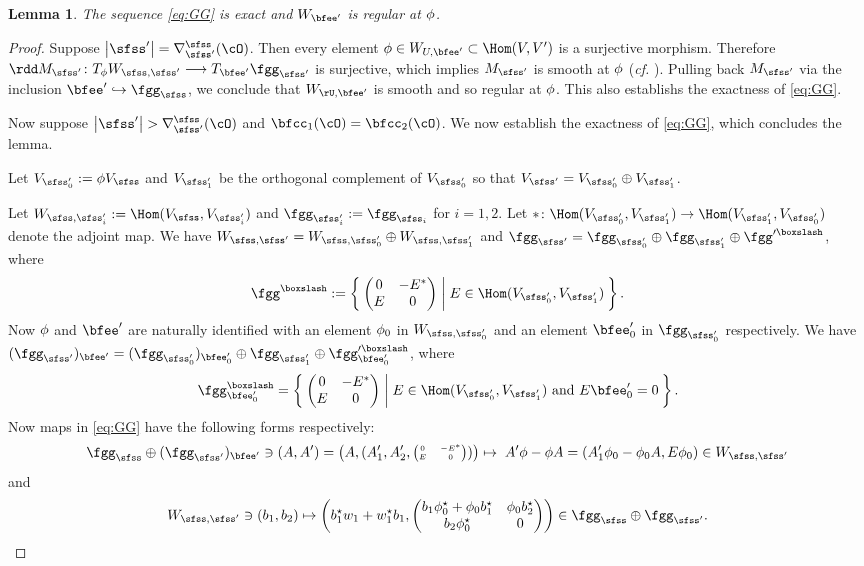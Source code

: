 \documentclass[12pt,a4paper]{amsart}
\def\abs#1{\left|{#1}\right|}
\newcommand{\E}{\mathbf{E}}
\numberwithin{equation}{section}
\newtheorem{lem}[thm]{Lemma}
\theoremstyle{remark}
\def\UU{\rU}
\def\mstar{{\star}}
\def\cf{\emph{cf.} }
\begin{document}
\begin{lem}
The sequence \eqref{eq:GG} is exact and $W_{\Xp}$ is regular at $\phi$.
\end{lem}
\begin{proof}

  Suppose $\abs{\sfss'} = \DDss(\cO)$. Then every element
  $\ww\in W_{U,\Xp}\subset \Hom(V,V')$ is a surjective morphism. Therefore
  $\rdd \Msp \colon T_{\ww} \Wss \longrightarrow T_{\Xp}\fggsp$ is surjective,
  which implies $\Msp$ is smooth at $\phi$ (\cf \cite[Proposition~10.4]{HS}).
  Pulling back $\Msp$ via the inclusion $\Xp \hookrightarrow \fggs$, we conclude
  that $W_{\UU,\Xp}$ is smooth and so regular at $\phi$. This also establishs the
  exactness of \eqref{eq:GG}.

  \smallskip

  Now suppose $\abs{\sfss'}>\DDss(\cO)$ and $\bfcc_{1}(\cO) = \bfcc_{2}(\cO)$.
  We now establish the exactness of \eqref{eq:GG}, which concludes the lemma.

  Let $\Vspo:=\ww \Vs$ and $\Vspt$ be the orthogonal complement of $\Vspo$ so
  that $\Vsp = \Vspo\oplus \Vspt$.

  Let $\Wssi := \Hom(\Vs,\Vspi)$ and $\fggspi := \fgg_{\sfss_{i}}$ for $i=1,2$.
  Let $*\colon \Hom(\Vspo,\Vspt) \rightarrow \Hom(\Vspt,\Vspo)$ denote the
  adjoint map. We have $\Wss =\Wsso \oplus \Wsst$ and
  $\fggsp = \fggspo\oplus \fggspt \oplus \fgg'^{\boxslash}$, where
  \[ \fgg^{\boxslash}:= \Set{\begin{pmatrix}
        0 & -E^*\\
        E & 0
      \end{pmatrix}|E\in \Hom(\Vspo,\Vspt)}.
  \]
  Now $\phi$ and $\Xp$ are naturally identified with an element $\phi_0$ in $\Wsso$
  and an element $\Xpo$ in $\fggspo$ respectively. We have
  $(\fggsp)_{\Xp} = (\fggspo)_{\Xpo} \oplus \fggspt \oplus \fgg'^{\boxslash}_{\Xpo}$,
  where %
  \[ \fgg^{\boxslash}_{\Xpo} = \Set{\begin{pmatrix}
        0 & -E^*\\
        E & 0
      \end{pmatrix}|E\in \Hom(\Vspo,\Vspt) \text{ and } E \Xpo = 0}.
  \]
  Now maps in \cref{eq:GG} have the following forms respectively:
  \[
    \fggs \oplus (\fggsp)_{\Xp}\ni (A,A') = \left(A, ( A'_1,A'_2,{\tiny \begin{pmatrix}0 & -E^*\\E &0\end{pmatrix}})\right) \mapsto \; A'\ww - \ww A= (A'_1 \wwo - \wwo A, E \wwo)\in \Wss
  \] and
  \[
    \Wss \ni (b_1,b_2) \mapsto \left(b_1^\mstar w_1 + w_1^\mstar b_1, \begin{pmatrix}
        b_1 \wwo^\mstar + \wwo b_1^\mstar & \wwo b_2^\mstar\\
        b_2 \wwo^\mstar & 0
      \end{pmatrix}\right)\in \fggs\oplus \fggsp.
  \]



\end{proof}
\end{document}
